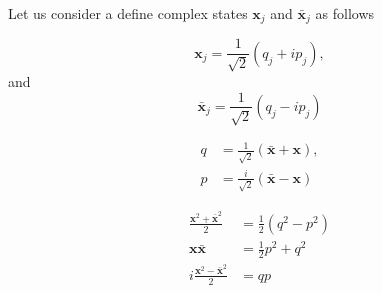 Let us consider a define complex states $\textbf{x}_j$ and $\bar{\textbf{x}}_j$ as follows

\begin{equation}
\label{eq: lad}
    \textbf{x}_j =\frac{1}{\sqrt{2}} \left(q_j+i p_j\right),
\end{equation}
and
\begin{equation}
\label{eq: ladc}
    \bar{\textbf{x}}_j = \frac{1}{\sqrt{2}}\left(q_j-ip_j\right)
\end{equation}



 \begin{align}
\label{eq: q}
    q &= \frac{1}{\sqrt{2}}(\bar{\textbf{x}}+\textbf{x}),\\
\label{eq: p}    
    p &= \frac{i}{\sqrt{2}}(\bar{\textbf{x}}-\textbf{x})
\end{align}

\begin{align}
    \frac{\textbf{x}^2+\bar{\textbf{x}}^2}{2} &= \frac{1}{2}(q^2-p^2)\\
    \textbf{x}\bar{\textbf{x}} &=\frac{1}{2} p^2+q^2\\
     i \frac{\textbf{x}^2-\bar{\textbf{x}}^2}{2} &= qp
\end{align}


\begin{comment}
Here $\omega=\sqrt{1/IC}$ is the generalized natural frequency, $I$ is the generalized inertance, and $C$ is the generalized compliance.
Some domain specific examples of inertances and compliances are listed in Table \ref{tb:elements}.
\begin{table}[h]
\caption{{\small Elements}}
\label{tb:elements}
\begin{center}
\begin{tabular}{lll}
\hline
\textbf{Generalized} & \textbf{Mechanical} & \textbf{Electrical} \\ \hline
Compliance, $C$      & Spring, $1/k$       & Capacitor, $C$      \\
Inertance, $I$       & Mass, $m$           & Inductor, $L$       \\
Resistance, $r$      & Damper, $b$         & Resistor, $R$       \\ \hline
\end{tabular}
\end{center}
\end{table}
\end{comment}















